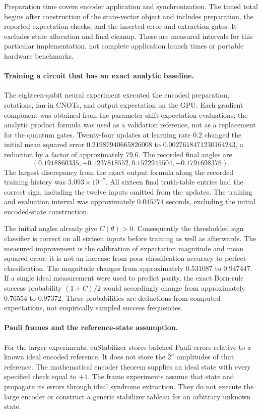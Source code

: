 Preparation time covers encoder application and synchronization.  The
timed total begins after construction of the state-vector object and
includes preparation, the reported expectation checks, and the inserted
error and extraction gates.  It excludes state allocation and final
cleanup.  These are measured intervals for this particular implementation,
not complete application launch times or portable hardware benchmarks.

\paragraph{Training a circuit that has an exact analytic baseline.}
The eighteen-qubit neural experiment executed the encoded preparation,
rotations, fan-in CNOTs, and output expectation on the GPU.  Each gradient
component was obtained from the parameter-shift expectation evaluations;
the analytic product formula was used as a validation reference, not as
a replacement for the quantum gates.  Twenty-four updates at learning
rate $0.2$ changed the initial mean squared error
$0.21987940665826008$ to $0.0027618471230164243$, a reduction by a
factor of approximately $79.6$.  The recorded final angles are
\[
 (0.1918860335,-0.1237818552,0.1522945504,-0.1791698376).
\]
The largest discrepancy from the exact output formula along the recorded
training history was $3.093\times10^{-7}$.  All sixteen final truth-table
entries had the correct sign, including the twelve inputs omitted from
the updates.  The training and evaluation interval was approximately
$0.045774$ seconds, excluding the initial encoded-state construction.

The initial angles already give $C(\theta)>0$.  Consequently the
thresholded sign classifier is correct on all sixteen inputs before
training as well as afterwards.  The measured improvement is the
calibration of expectation magnitude and mean squared error; it is not
an increase from poor classification accuracy to perfect classification.
The magnitude changes from approximately $0.531087$ to $0.947447$.
If a single ideal measurement were used to predict parity, the exact
Born-rule success probability $(1+C)/2$ would accordingly change from
approximately $0.76554$ to $0.97372$.  These probabilities are deductions
from computed expectations, not empirically sampled success frequencies.

\paragraph{Pauli frames and the reference-state assumption.}
For the larger experiments, cuStabilizer stores batched Pauli errors
relative to a known ideal encoded reference.  It does not store the
$2^n$ amplitudes of that reference.  The mathematical encoder theorem
supplies an ideal state with every specified check equal to $+1$.
The frame experiments assume that state and propagate its errors through
ideal syndrome extraction.  They do not execute the large encoder or
construct a generic stabilizer tableau for an arbitrary unknown state.

